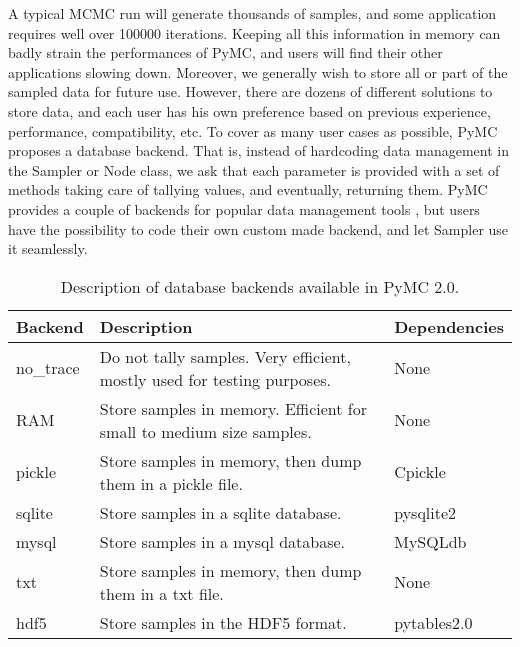

A typical MCMC run will generate thousands of samples, and some application requires well over 100000 iterations. Keeping all this information in memory can badly strain the performances of PyMC, and users will find their other applications slowing down. Moreover, we generally wish to store all or part of the sampled data for future use. However, there are dozens of different solutions to store data, and each user has his own preference based on previous experience, performance, compatibility, etc. To cover as many user cases as possible, PyMC proposes a database backend. That is, instead of hardcoding data management in the Sampler or Node class, we ask that each parameter is provided with a set of methods taking care of tallying values, and eventually, returning them. PyMC provides a couple of backends for popular data management tools , but users have the possibility to code their own custom made backend, and let Sampler use it seamlessly.


\begin{longtable}[c]{|p{0.12\locallinewidth}|p{0.60\locallinewidth}|p{0.20\locallinewidth}|}
\caption{Description of database backends available in PyMC 2.0.}\\
\hline
\textbf{
Backend
} & \textbf{
Description
} & \textbf{
Dependencies
} \\
\hline
\endhead

no{\_}trace
 & 
Do not tally samples. Very efficient, mostly used
for testing purposes.
 & 
None
 \\
\hline

RAM
 & 
Store samples in memory. Efficient for small to
medium size samples.
 & 
None
 \\
\hline

pickle
 & 
Store samples in memory, then dump them in a
pickle file.
 & 
Cpickle
 \\
\hline

sqlite
 & 
Store samples in a sqlite database.
 & 
pysqlite2
 \\
\hline

mysql
 & 
Store samples in a mysql database.
 & 
MySQLdb
 \\
\hline

txt
 & 
Store samples in memory, then dump them in a txt
file.
 & 
None
 \\
\hline

hdf5
 & 
Store samples in the HDF5 format.
 & 
pytables2.0
 \\
\hline
\end{longtable}

